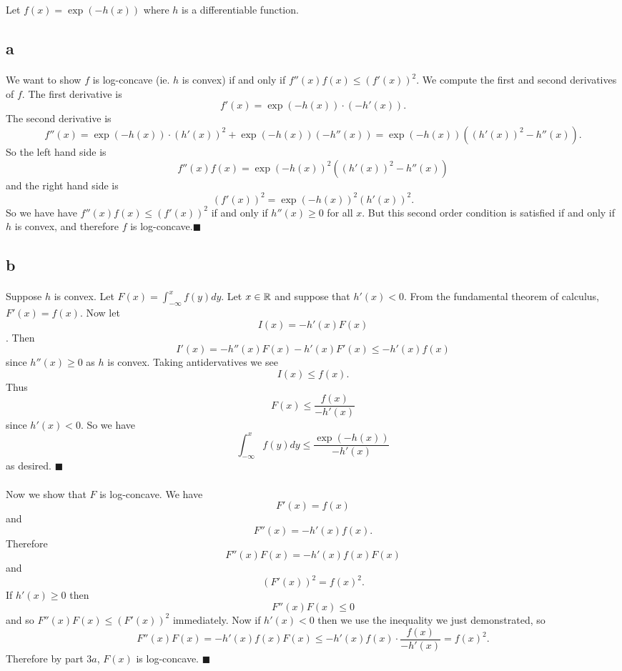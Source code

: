 \documentclass[letterpaper,12pt,oneside,onecolumn]{article}
\begin{document}
\section{}
\paragraph{}
Let $f(x) = \exp(-h(x))$ where $h$ is a differentiable function.
\subsection{a}
\paragraph{}
We want to show $f$ is log-concave (ie. $h$ is convex) if and only if $f''(x)f(x) \leq (f'(x))^2$. We compute the first and second derivatives of $f$. The first derivative is
$$f'(x) = \exp(-h(x))\cdot (-h'(x)).$$
The second derivative is 
$$f''(x) = \exp(-h(x)) \cdot (h'(x))^2 + \exp(-h(x))(-h''(x)) = \exp(-h(x))((h'(x))^2 - h''(x)).$$
So the left hand side is
$$f''(x)f(x) = \exp(-h(x))^2((h'(x))^2 - h''(x))$$
and the right hand side is
$$(f'(x))^2 = \exp(-h(x))^2(h'(x))^2.$$
So we have have $f''(x)f(x) \leq (f'(x))^2$ if and only if $h''(x) \geq 0$ for all $x$. But this second order condition is satisfied if and only if $h$ is convex, and therefore $f$ is log-concave.$\blacksquare$
\subsection{b}
\paragraph{}
Suppose $h$ is convex. Let $F(x) = \int_{-\infty}^x f(y) dy$. Let $x \in \mathbb{R}$ and suppose that $h'(x) < 0$. From the fundamental theorem of calculus, $F'(x) = f(x)$. Now let 
$$I(x) = -h'(x)F(x)$$.
Then $$I'(x) = -h''(x)F(x) -h'(x)F'(x) \leq -h'(x)f(x)$$
since $h''(x) \geq 0$ as $h$ is convex. Taking antidervatives we see
$$I(x) \leq f(x).$$
Thus
$$F(x) \leq \frac{f(x)}{-h'(x)}$$
since $h'(x) < 0$. So we have
$$\int_{-\infty}^xf(y)dy \leq \frac{\exp(-h(x))}{-h'(x)}$$
as desired. $\blacksquare$
\paragraph{}
Now we show that $F$ is log-concave. We have
$$F'(x) = f(x)$$
and
$$F''(x) = -h'(x)f(x).$$
Therefore
$$F''(x)F(x) = -h'(x)f(x) F(x)$$
and
$$(F'(x))^2 = f(x)^2.$$
If $h'(x) \geq 0$ then 
$$F''(x) F(x) \leq 0$$
and so $F''(x)F(x) \leq (F'(x))^2$ immediately. Now if $h'(x) < 0$ then we use the inequality we just demonstrated, so
$$F''(x) F(x) = -h'(x)f(x)F(x) \leq -h'(x)f(x) \cdot \frac{f(x)}{-h'(x)} = f(x)^2.$$
Therefore by part $3a$, $F(x)$ is log-concave. $\blacksquare$
\end{document}
